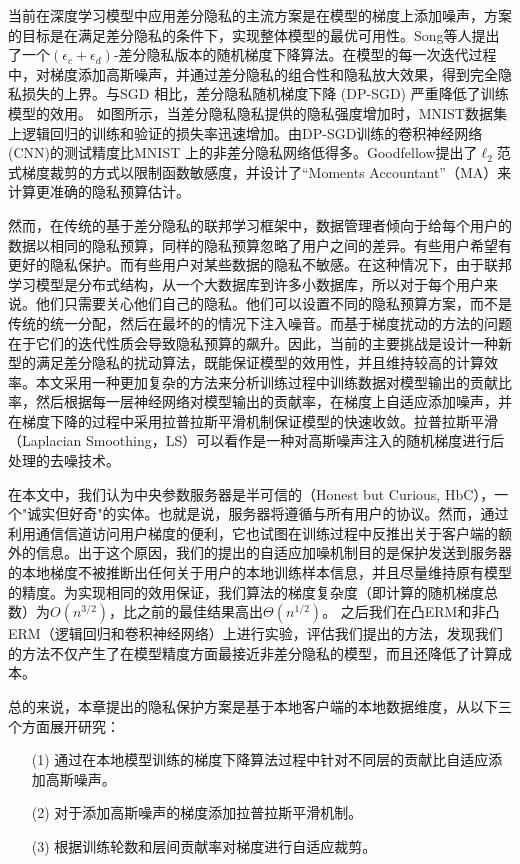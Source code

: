 当前在深度学习模型中应用差分隐私的主流方案是在模型的梯度上添加噪声，方案的目标是在满足差分隐私的条件下，实现整体模型的最优可用性。Song等人提出了一个$\left(\epsilon_{c}+\epsilon_{d}\right)$-差分隐私版本的随机梯度下降算法。在模型的每一次迭代过程中，对梯度添加高斯噪声，并通过差分隐私的组合性和隐私放大效果，得到完全隐私损失的上界。与SGD 相比，差分隐私随机梯度下降 (DP-SGD) 严重降低了训练模型的效用。 如图所示，当差分隐私隐私提供的隐私强度增加时，MNIST数据集上逻辑回归的训练和验证的损失率迅速增加。由DP-SGD训练的卷积神经网络(CNN)的测试精度比MNIST 上的非差分隐私网络低得多。Goodfellow提出了$\ell_{2}$范式梯度裁剪的方式以限制函数敏感度，并设计了“Moments Accountant”（MA）来计算更准确的隐私预算估计。

然而，在传统的基于差分隐私的联邦学习框架中，数据管理者倾向于给每个用户的数据以相同的隐私预算，同样的隐私预算忽略了用户之间的差异。有些用户希望有更好的隐私保护。而有些用户对某些数据的隐私不敏感。在这种情况下，由于联邦学习模型是分布式结构，从一个大数据库到许多小数据库，所以对于每个用户来说。他们只需要关心他们自己的隐私。他们可以设置不同的隐私预算方案，而不是传统的统一分配，然后在最坏的的情况下注入噪音。而基于梯度扰动的方法的问题在于它们的迭代性质会导致隐私预算的飙升。因此，当前的主要挑战是设计一种新型的满足差分隐私的扰动算法，既能保证模型的效用性，并且维持较高的计算效率。本文采用一种更加复杂的方法来分析训练过程中训练数据对模型输出的贡献比率，然后根据每一层神经网络对模型输出的贡献率，在梯度上自适应添加噪声，并在梯度下降的过程中采用拉普拉斯平滑机制保证模型的快速收敛。拉普拉斯平滑（Laplacian Smoothing，LS）可以看作是一种对高斯噪声注入的随机梯度进行后处理的去噪技术。

在本文中，我们认为中央参数服务器是半可信的（Honest but Curious, HbC），一个"诚实但好奇"的实体。也就是说，服务器将遵循与所有用户的协议。然而，通过利用通信信道访问用户梯度的便利，它也试图在训练过程中反推出关于客户端的额外的信息。出于这个原因，我们的提出的自适应加噪机制目的是保护发送到服务器的本地梯度不被推断出任何关于用户的本地训练样本信息，并且尽量维持原有模型的精度。为实现相同的效用保证，我们算法的梯度复杂度（即计算的随机梯度总数）为$O\left(n^{3 / 2}\right)$，比之前的最佳结果高出$\Theta\left(n^{1 / 2}\right)$。 之后我们在凸ERM和非凸ERM（逻辑回归和卷积神经网络）上进行实验，评估我们提出的方法，发现我们的方法不仅产生了在模型精度方面最接近非差分隐私的模型，而且还降低了计算成本。

总的来说，本章提出的隐私保护方案是基于本地客户端的本地数据维度，从以下三个方面展开研究：
\begin{enumerate}
\item [(1)] 通过在本地模型训练的梯度下降算法过程中针对不同层的贡献比自适应添加高斯噪声。
\item [(2)] 对于添加高斯噪声的梯度添加拉普拉斯平滑机制。
\item [(3)] 根据训练轮数和层间贡献率对梯度进行自适应裁剪。
\end{enumerate}

